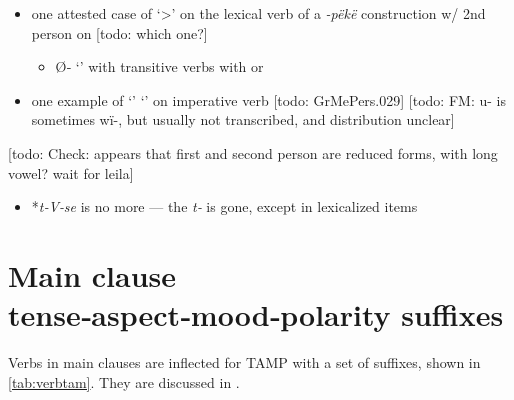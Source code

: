 \documentclass{memoir}
\begin{document}
\begin{itemize}
\tightlist
\item
  one attested case of  `\textgreater{}' on the
  lexical verb of a \emph{-pëkë} construction w/ 2nd person  on
   {[}todo: which one?{]}

  \begin{itemize}
  \tightlist
  \item
    Ø‑ `' with transitive verbs with  or
  \end{itemize}
\item
  one example of  `' `' on imperative verb
  {[}todo: GrMePers.029{]} {[}todo: FM: u- is sometimes wï-, but usually
  not transcribed, and distribution unclear{]}
\end{itemize}

{[}todo: Check: appears that first and second person are reduced forms,
with long vowel? wait for leila{]}

\begin{itemize}
\tightlist
\item
  *\emph{t‑V‑se} is no more --- the \emph{t‑} is gone, except in
  lexicalized items
\end{itemize}

\section{\texorpdfstring{Main clause tense‑aspect‑mood‑polarity suffixes
\label{sec:tam}}{Main clause tense‑aspect‑mood‑polarity suffixes }}

Verbs in main clauses are inflected for TAMP with a set of suffixes,
shown in \cref{tab:verbtam}. They are discussed in
.
\end{document}

